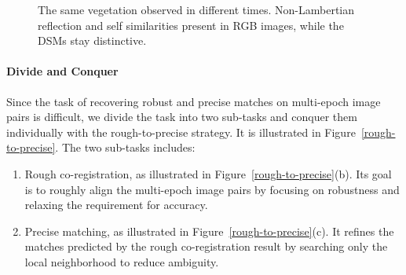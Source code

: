 \begin{figure}[htbp]
\begin{center}
{\begin{minipage}[t]{0.45\linewidth}
			\end{minipage}%
		}
		\caption{The same vegetation observed in different times. Non-Lambertian reflection and self similarities present in RGB images, while the \ac{DSM}s stay distinctive.}
		\label{PoorlyTextured}
	\end{center}
\end{figure} 

\paragraph{Divide and Conquer}
Since the task of recovering robust and precise matches on multi-epoch image pairs is difficult, we divide the task into two sub-tasks and conquer them individually with the rough-to-precise strategy. It is illustrated in Figure~\ref{rough-to-precise}. The two sub-tasks includes:\\
\begin{enumerate}
	\item Rough co-registration, as illustrated in Figure~\ref{rough-to-precise}(b). Its goal is to roughly align the multi-epoch image pairs by focusing on robustness and relaxing the requirement for accuracy.
	\item Precise matching, as illustrated in Figure~\ref{rough-to-precise}(c). It refines the matches predicted by the rough co-registration result by searching only the local neighborhood to reduce ambiguity.
\end{enumerate}

